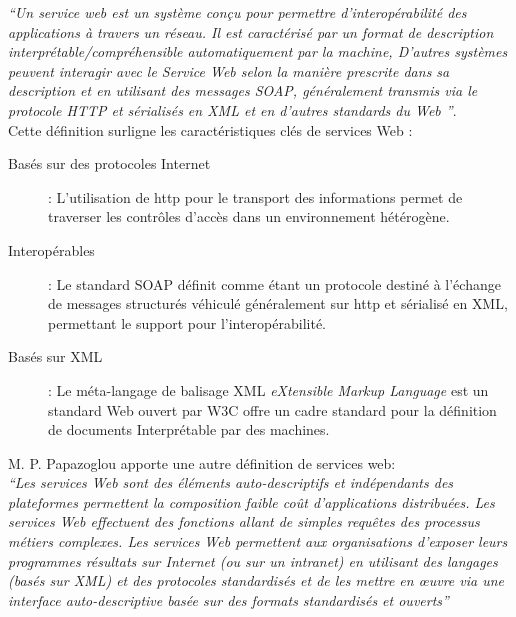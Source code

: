     \emph{``Un service web est un système conçu pour permettre
      d'interopérabilité des applications à travers un réseau.  Il est
      caractérisé par un format de description
      interprétable/compréhensible automatiquement par la machine,
      D'autres systèmes peuvent interagir avec le Service Web selon la
      manière prescrite dans sa description et en utilisant des messages
      SOAP, généralement transmis via
      le protocole HTTP et sérialisés en XML et en d'autres standards du Web ''}.\\

    Cette définition surligne les caractéristiques clés de services Web
    \cite{fremantle2002enterprise}:

    \SpecialItem
    \begin{description} %
    \item[Basés sur des protocoles Internet] : L'utilisation de
      \acrshort{http} pour le transport des informations permet de
      traverser les contrôles d'accès dans un environnement hétérogène.
  
    \item[Interopérables] : Le standard \textsc{SOAP} \cite{box2000simple}
      définit comme étant un protocole destiné à l'échange de messages
      structurés véhiculé généralement sur \acrshort{http} et sérialisé en
      \textsc{XML}, permettant le support pour l'interopérabilité.
      
    \item[Basés sur XML] : Le méta-langage de balisage \textsc{XML}
      \textit{eXtensible Markup Language} est un standard Web ouvert par
      \textsc{W3C} \cite{bray1998extensible} offre un cadre standard pour
      la définition de documents Interprétable par des machines.
    \end{description}
    
    M. P. Papazoglou \cite{papazoglou2003service} apporte une autre définition de services web:\\
    \emph{``Les services Web sont des éléments auto-descriptifs et
      indépendants des plateformes permettent la composition faible coût
      d’applications distribuées. Les services Web effectuent des
      fonctions allant de simples requêtes des processus métiers
      complexes. Les services Web permettent aux organisations d’exposer
      leurs programmes résultats sur Internet (ou sur un intranet) en
      utilisant des langages (basés sur XML) et des protocoles
      standardisés et de les mettre en œuvre via une interface
      auto-descriptive basée sur des formats standardisés et ouverts''}
    
